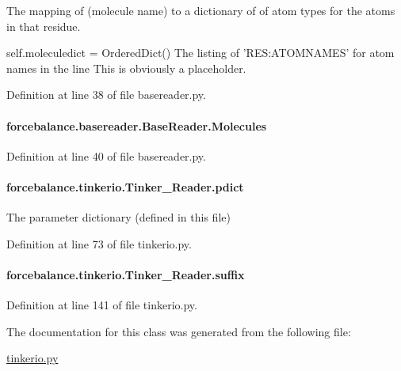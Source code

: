 The mapping of (molecule name) to a dictionary of of atom types for the atoms in that residue. 

self.\-moleculedict = Ordered\-Dict() The listing of 'R\-E\-S\-:A\-T\-O\-M\-N\-A\-M\-E\-S' for atom names in the line This is obviously a placeholder. 

Definition at line 38 of file basereader.\-py.

\hypertarget{classforcebalance_1_1basereader_1_1BaseReader_ad2842550aa690f1cd82e41ec8d6fe541}{
\paragraph[{Molecules}]{\setlength{\rightskip}{0pt plus 5cm}forcebalance.\-basereader.\-Base\-Reader.\-Molecules\hspace{0.3cm}{\ttfamily [inherited]}}}\label{classforcebalance_1_1basereader_1_1BaseReader_ad2842550aa690f1cd82e41ec8d6fe541}


Definition at line 40 of file basereader.\-py.

\hypertarget{classforcebalance_1_1tinkerio_1_1Tinker__Reader_a357973ff305fe5135067499292f32a37}{
\paragraph[{pdict}]{\setlength{\rightskip}{0pt plus 5cm}forcebalance.\-tinkerio.\-Tinker\-\_\-\-Reader.\-pdict}}\label{classforcebalance_1_1tinkerio_1_1Tinker__Reader_a357973ff305fe5135067499292f32a37}


The parameter dictionary (defined in this file) 



Definition at line 73 of file tinkerio.\-py.

\hypertarget{classforcebalance_1_1tinkerio_1_1Tinker__Reader_ad9a91824cf94ed13b39a115ebbd784c3}{
\paragraph[{suffix}]{\setlength{\rightskip}{0pt plus 5cm}forcebalance.\-tinkerio.\-Tinker\-\_\-\-Reader.\-suffix}}\label{classforcebalance_1_1tinkerio_1_1Tinker__Reader_ad9a91824cf94ed13b39a115ebbd784c3}


Definition at line 141 of file tinkerio.\-py.



The documentation for this class was generated from the following file\-:\begin{DoxyCompactItemize}
\item 
\hyperlink{tinkerio_8py}{tinkerio.\-py}\end{DoxyCompactItemize}
